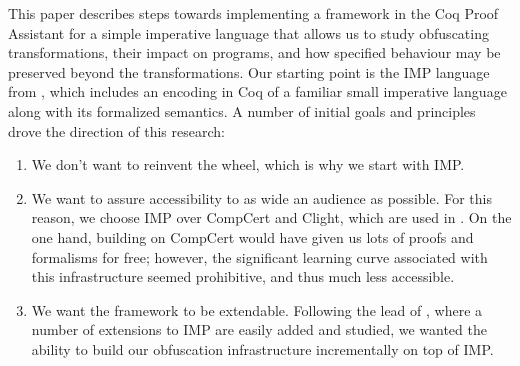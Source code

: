 \documentclass[compsoc,conference,a4paper,10pt,times]{IEEEtran}
\begin{document}
This paper describes steps towards implementing a framework in the Coq Proof Assistant \cite{Coq} for a simple imperative language that allows us to study obfuscating transformations, their impact on programs, and how specified behaviour may be preserved beyond the transformations. Our starting point is the IMP language from \cite{SFV2}, which includes an encoding in Coq of a familiar small imperative language along with its formalized semantics.
A number of initial goals and principles drove the direction of this research: 
 \begin{enumerate}
  \item We don't want to reinvent the wheel, which is why we start with IMP.
  \item We want to assure accessibility to as wide an audience as possible. For this reason, we choose IMP over CompCert and Clight, which are used in \cite{Blazy2}.  On the one hand, building on CompCert would have given us lots of proofs and formalisms for free; however, the significant learning curve associated with this infrastructure seemed prohibitive, and thus much less accessible.\label{goal2}
  \item We want the framework to be extendable.  Following the lead of \cite{SFV2}, where a number of extensions to IMP are easily added and studied, we wanted the ability to build our obfuscation infrastructure incrementally on top of IMP.\label{goal3}
  \end{enumerate}
\end{document}
